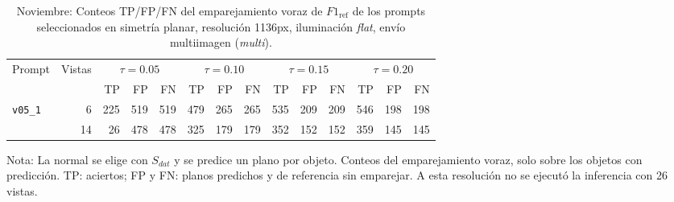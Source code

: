 \begin{table}[htbp]
\centering
\caption{Noviembre: Conteos TP/FP/FN del emparejamiento voraz de $F1_{\mathrm{ref}}$ de los prompts seleccionados en simetría planar, resolución 1136px, iluminación \textit{flat}, envío multiimagen (\textit{multi}).}
\label{tab:nov_plane_1136_conteos}
\begin{lrbox}{\tablebox}
\begin{adjustbox}{max width=\textwidth}
\begin{tabular}{lrrrrrrrrrrrrr}
\toprule
\multirow{2}{*}{Prompt} & \multirow{2}{*}{Vistas} & \multicolumn{3}{c}{$\tau{=}0.05$} & \multicolumn{3}{c}{$\tau{=}0.10$} & \multicolumn{3}{c}{$\tau{=}0.15$} & \multicolumn{3}{c}{$\tau{=}0.20$} \\
\cmidrule(lr){3-5} \cmidrule(lr){6-8} \cmidrule(lr){9-11} \cmidrule(lr){12-14}
 &  & TP & FP & FN & TP & FP & FN & TP & FP & FN & TP & FP & FN \\
\midrule
\multirow{2}{*}{\texttt{v05\_1}} & 6 & 225 & 519 & 519 & 479 & 265 & 265 & 535 & 209 & 209 & 546 & 198 & 198 \\
 & 14 & 26 & 478 & 478 & 325 & 179 & 179 & 352 & 152 & 152 & 359 & 145 & 145 \\
\bottomrule
\end{tabular}
\end{adjustbox}
\end{lrbox}
\usebox{\tablebox}

\vspace{1.5ex}
\begin{minipage}{\wd\tablebox}
\footnotesize
Nota: La normal se elige con $S_{dat}$ y se predice un plano por objeto. Conteos del emparejamiento voraz, solo sobre los objetos con predicción. TP: aciertos; FP y FN: planos predichos y de referencia sin emparejar. A esta resolución no se ejecutó la inferencia con 26 vistas.
\end{minipage}
\end{table}

\clearpage


